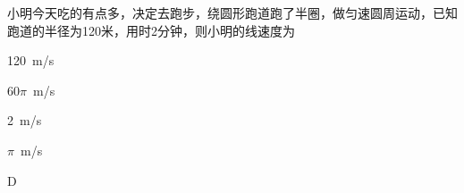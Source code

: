 小明今天吃的有点多，决定去跑步，绕圆形跑道跑了半圈，做匀速圆周运动，已知跑道的半径为120米，用时2分钟，则小明的线速度为\paren[]
\begin{choices}
	\item \qty{120}{m/s}
	\item \(60\pi\)\qty{}{m/s}
	\item \qty{2}{m/s}
	\item \(\pi\)\qty{}{m/s}
\end{choices}
\begin{answer}
	D
\end{answer}